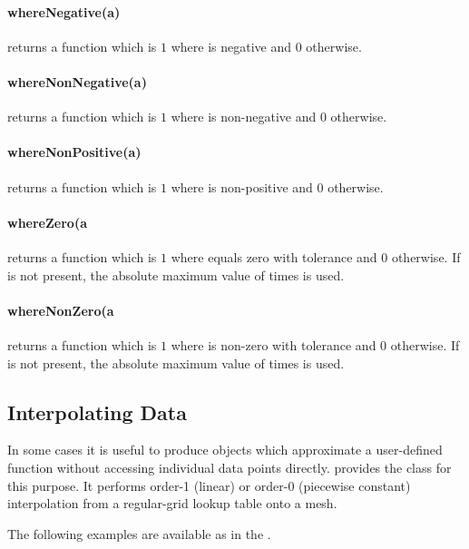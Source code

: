 \paragraph{whereNegative(a)}
returns a function which is $1$ where  is negative and $0$ otherwise.


\paragraph{whereNonNegative(a)}
returns a function which is $1$ where  is non-negative and $0$ otherwise.


\paragraph{whereNonPositive(a)}
returns a function which is $1$ where  is non-positive and $0$ otherwise.


\paragraph{whereZero(a}
returns a function which is $1$ where  equals zero with tolerance
 and $0$ otherwise. If  is not present, the absolute maximum
value of  times  is used.


\paragraph{whereNonZero(a}
returns a function which is $1$ where  is non-zero with tolerance
 and $0$ otherwise. If  is not present, the absolute maximum
value of  times  is used.


\subsection{Interpolating Data}
\label{sec:interpolation}
In some cases it is useful to produce \Data objects which approximate a
user-defined function without accessing individual data points directly.
\escript provides the  class for this purpose.
It performs order-1 (linear) or order-0 (piecewise constant) interpolation
from a regular-grid lookup table onto a mesh.

The following examples are available as  in the
\ExampleDirectory.


